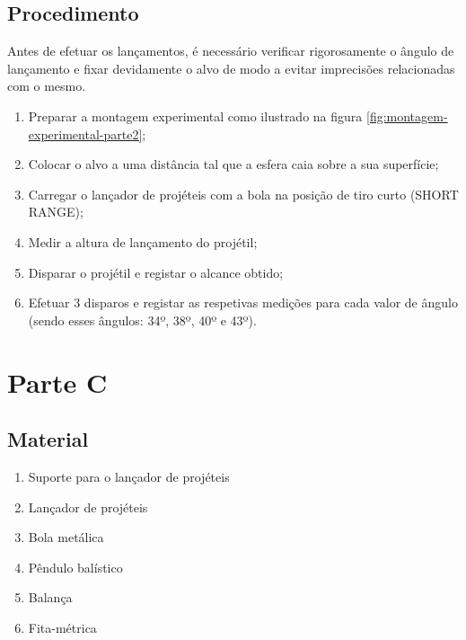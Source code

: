 {\subsection{Procedimento}
\label{subsec:detalhes-experimentais-relevantes-parte2-procedimento}

Antes de efetuar os lançamentos, é necessário verificar rigorosamente o ângulo de lançamento e fixar devidamente o alvo de modo a evitar imprecisões relacionadas com o mesmo.

\begin{enumerate}
    \item Preparar a montagem experimental como ilustrado na figura \ref{fig:montagem-experimental-parte2};
    \item Colocar o alvo a uma distância tal que a esfera caia sobre a sua superfície;
    \item Carregar o lançador de projéteis com a bola na posição de tiro curto (SHORT RANGE);
    \item Medir a altura de lançamento do projétil;
    \item Disparar o projétil e registar o alcance obtido;
    \item Efetuar 3 disparos e registar as respetivas medições para cada valor de ângulo (sendo esses ângulos: 34º, 38º, 40º e 43º).
\end{enumerate}

\pagebreak

\section{Parte C}
\label{sec:detalhes-experimentais-relevantes-parte3}

\subsection{Material}
\label{subsec:detalhes-experimentais-relevantes-parte3-material}

\begin{enumerate}
    \item Suporte para o lançador de projéteis
    \item Lançador de projéteis
    \item Bola metálica
    \item Pêndulo balístico
    \item Balança
    \item Fita-métrica
\end{enumerate}

}
